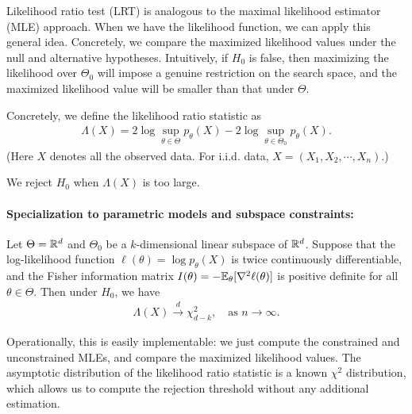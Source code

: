 \documentclass[11pt,letterpaper]{article}
\numberwithin{assumption}{lecture}
\numberwithin{theorem}{lecture}
\numberwithin{proposition}{lecture}
\numberwithin{lemma}{lecture}
\numberwithin{claim}{lecture}
\numberwithin{corollary}{lecture}
\numberwithin{definition}{lecture}
\numberwithin{conjecture}{lecture}
\numberwithin{remark}{lecture}
\numberwithin{example}{lecture}
\numberwithin{equation}{lecture}
\begin{document}
Likelihood ratio test (LRT) is analogous to the maximal likelihood estimator (MLE) approach. When we have the likelihood function, we can apply this general idea. Concretely, we compare the maximized likelihood values under the null and alternative hypotheses. Intuitively, if $H_0$ is false, then maximizing the likelihood over $\Theta_0$ will impose a genuine restriction on the search space, and the maximized likelihood value will be smaller than that under $\Theta$.

Concretely, we define the likelihood ratio statistic as
\begin{align*}
  \Lambda (X) = 2 \log \sup_{\theta \in \Theta} p_\theta (X) - 2 \log \sup_{\theta \in \Theta_0} p_\theta (X).
\end{align*}
(Here $X$ denotes all the observed data. For i.i.d. data, $X = (X_1, X_2, \cdots, X_n)$.)

We reject $H_0$ when $\Lambda (X)$ is too large.

\paragraph{Specialization to parametric models and subspace constraints:}

\begin{theorem}
  Let $\Theta = \mathbb{R}^d$ and $\Theta_0$ be a $k$-dimensional linear subspace of $\mathbb{R}^d$. Suppose that the log-likelihood function $\ell (\theta) = \log p_\theta (X)$ is twice continuously differentiable, and the Fisher information matrix $I(\theta) = - {\mathbb{E}}_\theta [\nabla^2 \ell (\theta)]$ is positive definite for all $\theta \in \Theta$. Then under $H_0$, we have
  \begin{align*}
    \Lambda (X) \xrightarrow{d} \chi^2_{d - k}, \quad \text{as } n \to \infty.
  \end{align*}
\end{theorem}
Operationally, this is easily implementable: we just compute the constrained and unconstrained MLEs, and compare the maximized likelihood values. The asymptotic distribution of the likelihood ratio statistic is a known $\chi^2$ distribution, which allows us to compute the rejection threshold without any additional estimation.
\end{document}
